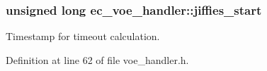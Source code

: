 \subsubsection[{jiffies\-\_\-start}]{\setlength{\rightskip}{0pt plus 5cm}unsigned long ec\-\_\-voe\-\_\-handler\-::jiffies\-\_\-start}\label{structec__voe__handler_a394c2e7f86802ae0c78a1d7f5a762cc5}


Timestamp for timeout calculation. 



Definition at line 62 of file voe\-\_\-handler.\-h.

